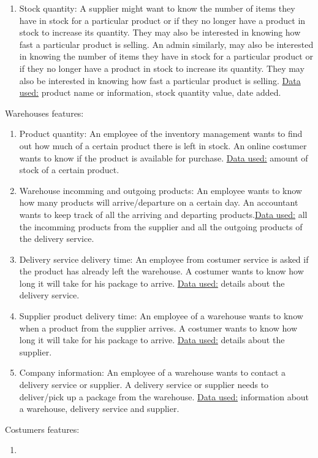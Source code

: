 \documentclass{article}
\begin{document}
\begin{enumerate}
  \item Stock quantity: A supplier might want to know the number of items they have in stock for a particular product or if they no longer have a product in stock to increase its quantity. They may also be interested in knowing how fast a particular product is selling. An admin similarly, may also be interested in knowing the number of items they have in stock for a particular product or if they no longer have a product in stock to increase its quantity. They may also be interested in knowing how fast a particular product is selling. \underline{Data used:} product name or information, stock quantity value, date added.
\end{enumerate}

\noindent Warehouses features:
\begin{enumerate}
  \item Product quantity: An employee of the inventory management wants to find out how much of a certain product there is left in stock. An online costumer wants to know if the product is available for purchase.
  \underline{Data used:} amount of stock of a certain product.
  \item Warehouse incomming and outgoing products: An employee wants to know how many products will arrive/departure on a certain day. An accountant wants to keep track of all the arriving and departing products.\underline{Data used:} all the incomming products from the supplier and all the outgoing products of the delivery service.
  \item Delivery service delivery time: An employee from costumer service is asked if the product has already left the warehouse. A costumer wants to know how long it will take for his package to arrive.
  \underline{Data used:} details about the delivery service.
  \item Supplier product delivery time: An employee of a warehouse wants to know when a product from the supplier arrives. A costumer wants to know how long it will take for his package to arrive.
  \underline{Data used:} details about the supplier.
  \item Company information: An employee of a warehouse wants to contact a delivery service or supplier. A delivery service or supplier needs to deliver/pick up a package from the warehouse.
  \underline{Data used:} information about a warehouse, delivery service and supplier.
\end{enumerate}

\noindent Costumers features:
\begin{enumerate}
  \item
\end{enumerate}
\end{document}
